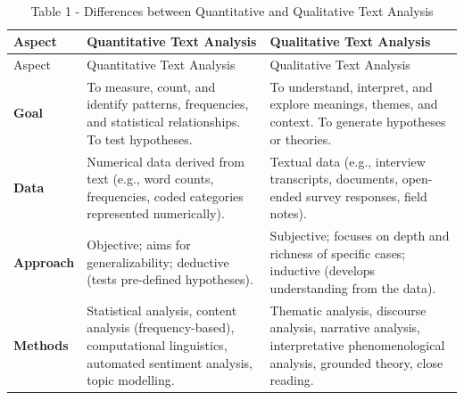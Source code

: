 \documentclass[
]{book}
\begin{document}
\(~\)

\begin{longtable}[]{@{}
  >{\raggedright\arraybackslash}p{}
  >{\raggedright\arraybackslash}p{}
  >{\raggedright\arraybackslash}p{}@{}}
\caption{Table 1 - Differences between Quantitative and Qualitative Text Analysis}\tabularnewline
\toprule\noalign{}
\begin{minipage}[b]{\linewidth}\raggedright
Aspect
\end{minipage} & \begin{minipage}[b]{\linewidth}\raggedright
Quantitative Text Analysis
\end{minipage} & \begin{minipage}[b]{\linewidth}\raggedright
Qualitative Text Analysis
\end{minipage} \\
\midrule\noalign{}
\endfirsthead
\toprule\noalign{}
\begin{minipage}[b]{\linewidth}\raggedright
Aspect
\end{minipage} & \begin{minipage}[b]{\linewidth}\raggedright
Quantitative Text Analysis
\end{minipage} & \begin{minipage}[b]{\linewidth}\raggedright
Qualitative Text Analysis
\end{minipage} \\
\midrule\noalign{}
\endhead
\bottomrule\noalign{}
\endlastfoot
\textbf{Goal} & To measure, count, and identify patterns, frequencies, and statistical relationships. To test hypotheses. & To understand, interpret, and explore meanings, themes, and context. To generate hypotheses or theories. \\
\textbf{Data} & Numerical data derived from text (e.g., word counts, frequencies, coded categories represented numerically). & Textual data (e.g., interview transcripts, documents, open-ended survey responses, field notes). \\
\textbf{Approach} & Objective; aims for generalizability; deductive (tests pre-defined hypotheses). & Subjective; focuses on depth and richness of specific cases; inductive (develops understanding from the data). \\
\textbf{Methods} & Statistical analysis, content analysis (frequency-based), computational linguistics, automated sentiment analysis, topic modelling. & Thematic analysis, discourse analysis, narrative analysis, interpretative phenomenological analysis, grounded theory, close reading. \\

\end{longtable}
\end{document}
